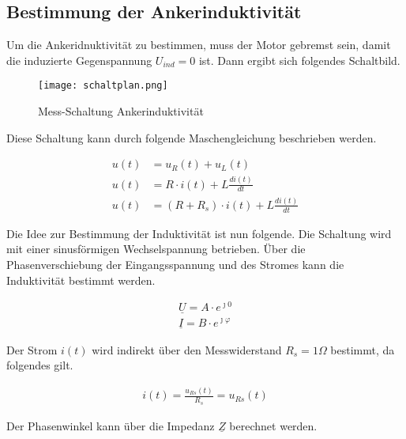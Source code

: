 \subsection{Bestimmung der Ankerinduktivität}

Um die Ankeridnuktivität zu bestimmen, muss der Motor gebremst sein,
damit die induzierte Gegenspannung $U_{ind} = 0$ ist. Dann ergibt sich
folgendes Schaltbild.


\begin{figure}[H]
    \centering
    \texttt{[image: schaltplan.png]}
    \caption{Mess-Schaltung Ankerinduktivität}
    \label{fig:PlotAufgabe1}
   \end{figure}

Diese Schaltung kann durch folgende Maschengleichung beschrieben werden.

\begin{equation} \label{eq211}
    \begin{split}
        u(t)&=u_R(t) + u_L(t)\\
        u(t)&=R \cdot i(t) + L \frac{d i(t)}{dt}\\
        u(t)&= (R+R_s) \cdot i(t) + L \frac{d i(t)}{dt}
    \end{split}
\end{equation}

Die Idee zur Bestimmung der Induktivität ist nun folgende. Die Schaltung
wird mit einer sinusförmigen Wechselspannung betrieben. Über die
Phasenverschiebung der Eingangsspannung und des Stromes kann die Induktivität
bestimmt werden.

\begin{equation} \label{eq212}
    \begin{split}
        \underline{U} = A \cdot e^{\jmath 0}\\
        \underline{I} = B \cdot e^{\jmath \varphi}
    \end{split}
\end{equation}

Der Strom $i(t)$ wird indirekt über den Messwiderstand $R_s= 1\Omega$
bestimmt, da folgendes gilt.

\begin{equation} \label{eq213}
    \begin{split}
        i(t)=\frac{u_{Rs}(t)}{R_s} = u_{Rs}(t)
    \end{split}
\end{equation}

Der Phasenwinkel kann über die Impedanz $\underline{Z}$ berechnet werden.

